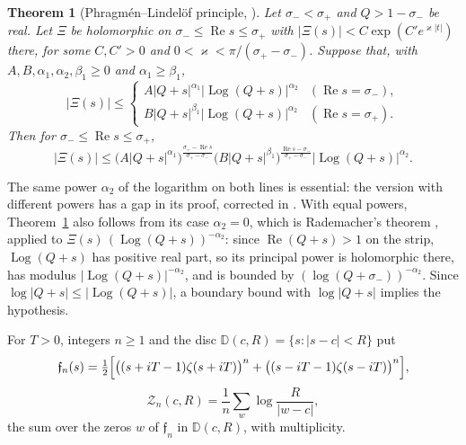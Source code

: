 \documentclass[11pt,a4paper]{article}
\makeatletter
\numberwithin{equation}{section}
\DeclareRobustCommand{\CGref}[1]{\ref{#1}}
\DeclareRobustCommand{\CGcite}[2][]{\if\relax\detokenize{#1}\relax\cite{#2}\else\cite[#1]{#2}\fi}
\let\CG@origref\ref
\newcommand{\CG@gettip}[1]{\@ifundefined{CGTip@#1}{#1}{\csname CGTip@#1\endcsname}}
\newcommand{\CG@getbib}[1]{\@ifundefined{CGBib@#1}{#1}{\csname CGBib@#1\endcsname}}
\DeclareRobustCommand{\CGref}[1]{\pdftooltip{\CG@origref{#1}}{\CG@gettip{#1}}}
\DeclareRobustCommand{\CGcite}[2][]{\pdftooltip{\if\relax\detokenize{#1}\relax\cite{#2}\else\cite[#1]{#2}\fi}{\CG@getbib{#2}}}
\newtheorem{theorem}{Theorem}[section]
\theoremstyle{definition}
\theoremstyle{remark}
\makeatother
\begin{document}
\begin{theorem}[{Phragm\'en--Lindel\"of principle, \CGcite[Cor.~3]{Fiori2025}}]\label{thm:known_PL}
Let $\sigma_-<\sigma_+$ and $Q>1-\sigma_-$ be real. Let $\Xi$ be holomorphic on $\sigma_-\le\operatorname{Re}s\le\sigma_+$ with $|\Xi(s)|<C\exp(C'e^{\varkappa|t|})$ there, for some $C,C'>0$ and $0<\varkappa<\pi/(\sigma_+-\sigma_-)$. Suppose that, with $A,B,\alpha_1,\alpha_2,\beta_1\ge0$ and $\alpha_1\ge\beta_1$,
\begin{equation}
|\Xi(s)|\le\begin{cases}A|Q+s|^{\alpha_1}|\operatorname{Log}(Q+s)|^{\alpha_2}&(\operatorname{Re}s=\sigma_-),\\ B|Q+s|^{\beta_1}|\operatorname{Log}(Q+s)|^{\alpha_2}&(\operatorname{Re}s=\sigma_+).\end{cases}
\label{eq:disp_03}
\end{equation}
Then for $\sigma_-\le\operatorname{Re}s\le\sigma_+$,
\begin{equation}
|\Xi(s)|\le\bigl(A|Q+s|^{\alpha_1}\bigr)^{\frac{\sigma_+-\operatorname{Re}s}{\sigma_+-\sigma_-}}\bigl(B|Q+s|^{\beta_1}\bigr)^{\frac{\operatorname{Re}s-\sigma_-}{\sigma_+-\sigma_-}}|\operatorname{Log}(Q+s)|^{\alpha_2}.
\label{eq:disp_04}
\end{equation}
\end{theorem}
The same power $\alpha_2$ of the logarithm on both lines is essential: the version with different powers \CGcite[Lemma~3]{Trudgian2014} has a gap in its proof, corrected in \CGcite{Fiori2025}. With equal powers, Theorem~\CGref{thm:known_PL} also follows from its case $\alpha_2=0$, which is Rademacher's theorem \CGcite{Rademacher1959}, applied to $\Xi(s)\,(\operatorname{Log}(Q+s))^{-\alpha_2}$: since $\operatorname{Re}(Q+s)>1$ on the strip, $\operatorname{Log}(Q+s)$ has positive real part, so its principal power is holomorphic there, has modulus $|\operatorname{Log}(Q+s)|^{-\alpha_2}$, and is bounded by $(\log(Q+\sigma_-))^{-\alpha_2}$. Since $\log|Q+s|\le|\operatorname{Log}(Q+s)|$, a boundary bound with $\log|Q+s|$ implies the hypothesis.

For $T>0$, integers $n\ge1$ and the disc $\mathbb D(c,R)=\{s:|s-c|<R\}$ put
\begin{equation}
\mathfrak f_n(s)=\tfrac12\Bigl[\bigl((s+iT-1)\zeta(s+iT)\bigr)^n+\bigl((s-iT-1)\zeta(s-iT)\bigr)^n\Bigr],
\label{eq:backlund_f}
\end{equation}
\begin{equation}
\mathcal Z_n(c,R)=\frac1n\sum_{w}\log\frac R{|w-c|},
\label{eq:backlund_Z}
\end{equation}
the sum over the zeros $w$ of $\mathfrak f_n$ in $\mathbb D(c,R)$, with multiplicity.
\end{document}
